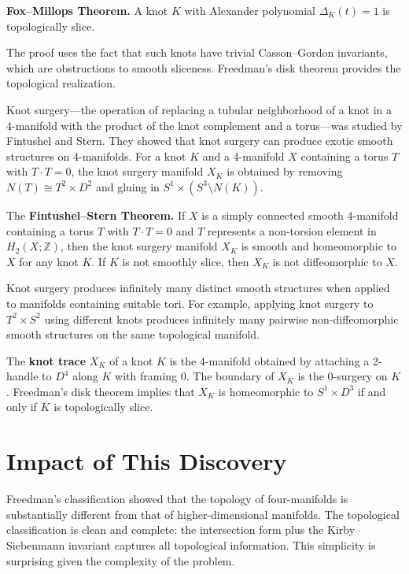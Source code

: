 \textbf{Fox--Millops Theorem.} A knot $K$ with Alexander polynomial $\Delta_K(t) = 1$ is topologically slice.

The proof uses the fact that such knots have trivial Casson--Gordon invariants, which are obstructions to smooth sliceness. Freedman's disk theorem provides the topological realization.

Knot surgery---the operation of replacing a tubular neighborhood of a knot in a 4-manifold with the product of the knot complement and a torus---was studied by Fintushel and Stern. They showed that knot surgery can produce exotic smooth structures on 4-manifolds. For a knot $K$ and a 4-manifold $X$ containing a torus $T$ with $T \cdot T = 0$, the knot surgery manifold $X_K$ is obtained by removing $N(T) \cong T^2 \times D^2$ and gluing in $S^1 \times (S^3 \setminus N(K))$.

The \textbf{Fintushel--Stern Theorem.} If $X$ is a simply connected smooth 4-manifold containing a torus $T$ with $T \cdot T = 0$ and $T$ represents a non-torsion element in $H_2(X;\mathbb{Z})$, then the knot surgery manifold $X_K$ is smooth and homeomorphic to $X$ for any knot $K$. If $K$ is not smoothly slice, then $X_K$ is not diffeomorphic to $X$.

Knot surgery produces infinitely many distinct smooth structures when applied to manifolds containing suitable tori. For example, applying knot surgery to $T^2 \times S^2$ using different knots produces infinitely many pairwise non-diffeomorphic smooth structures on the same topological manifold.

The \textbf{knot trace} $X_K$ of a knot $K$ is the 4-manifold obtained by attaching a 2-handle to $D^4$ along $K$ with framing 0. The boundary of $X_K$ is the 0-surgery on $K$. Freedman's disk theorem implies that $X_K$ is homeomorphic to $S^1 \times D^3$ if and only if $K$ is topologically slice.

\section{Impact of This Discovery}

Freedman's classification showed that the topology of four-manifolds is substantially different from that of higher-dimensional manifolds. The topological classification is clean and complete: the intersection form plus the Kirby--Siebenmann invariant captures all topological information. This simplicity is surprising given the complexity of the problem.

